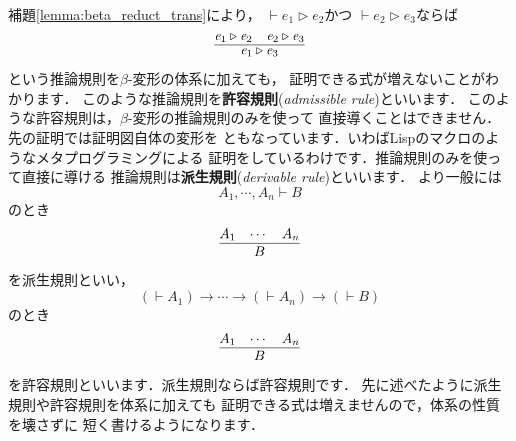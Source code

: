 \documentclass{ltjsbook}%
\newcommand\lemmaname{補題}%
\newcommand\term[2]{\textbf{#1}{(\textit{#2})}}%
\begin{document}
\lemmaname\ref{lemma:beta_reduct_trans}により，%
$\vdash\mathit{e}_1\triangleright\mathit{e}_2$かつ%
$\vdash\mathit{e}_2\triangleright\mathit{e}_3$ならば%
\begin{equation}%
  \infer{%
    \mathit{e}_1\triangleright\mathit{e}_3%
  }{%
    \mathit{e}_1\triangleright\mathit{e}_2%
  &%
    \mathit{e}_2\triangleright\mathit{e}_3%
  }%
\end{equation}%
という推論規則を$\beta$-変形の体系に加えても，%
証明できる式が増えないことがわかります．%
このような推論規則を\term{許容規則}{admissible rule}といいます．%
このような許容規則は，$\beta$-変形の推論規則のみを使って%
直接導くことはできません．先の証明では証明図自体の変形を%
ともなっています．いわばLispのマクロのようなメタプログラミングによる%
証明をしているわけです．推論規則のみを使って直接に導ける%
推論規則は\term{派生規則}{derivable rule}といいます．%
より一般には%
\begin{equation}%
  A_1,\cdots,A_n\vdash B%
\end{equation}%
のとき%
\begin{equation}%
  \infer{%
    B%
  }{%
    A_1&\cdots&A_n%
  }%
\end{equation}%
を派生規則といい，%
\begin{equation}%
  (\vdash A_1)\rightarrow\cdots\rightarrow(\vdash A_n)\rightarrow(\vdash B)%
\end{equation}%
のとき%
\begin{equation}%
  \infer{%
    B%
  }{%
    A_1&\cdots&A_n%
  }%
\end{equation}%
を許容規則といいます．派生規則ならば許容規則です．%
先に述べたように派生規則や許容規則を体系に加えても%
証明できる式は増えませんので，体系の性質を壊さずに%
短く書けるようになります．%
\end{document}
